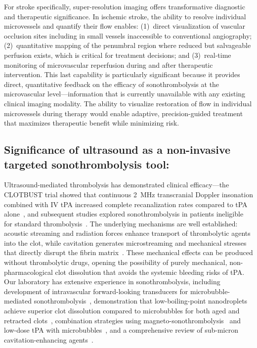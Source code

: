 For stroke specifically, super-resolution imaging offers transformative diagnostic and therapeutic significance. In ischemic stroke, the ability to resolve individual microvessels and quantify their flow enables: (1)~direct visualization of vascular occlusion sites including in small vessels inaccessible to conventional angiography; (2)~quantitative mapping of the penumbral region where reduced but salvageable perfusion exists, which is critical for treatment decisions; and (3)~real-time monitoring of microvascular reperfusion during and after therapeutic intervention. This last capability is particularly significant because it provides direct, quantitative feedback on the efficacy of sonothrombolysis at the microvascular level---information that is currently unavailable with any existing clinical imaging modality. The ability to visualize restoration of flow in individual microvessels during therapy would enable adaptive, precision-guided treatment that maximizes therapeutic benefit while minimizing risk.

\subsection{Significance of ultrasound as a non-invasive targeted sonothrombolysis tool:}
Ultrasound-mediated thrombolysis has demonstrated clinical efficacy---the CLOTBUST trial showed that continuous 2~MHz transcranial Doppler insonation combined with IV tPA increased complete recanalization rates compared to tPA alone~\cite{alexandrov2004ultrasound}, and subsequent studies explored sonothrombolysis in patients ineligible for standard thrombolysis~\cite{eggers2005sonothrombolysis,eggers2008sonothrombolysis}. The underlying mechanisms are well established: acoustic streaming and radiation forces enhance transport of thrombolytic agents into the clot, while cavitation generates microstreaming and mechanical stresses that directly disrupt the fibrin matrix~\cite{datta2006correlation,everbach2000cavitational}. These mechanical effects can be produced without thrombolytic drugs, opening the possibility of purely mechanical, non-pharmacological clot dissolution that avoids the systemic bleeding risks of tPA. Our laboratory has extensive experience in sonothrombolysis, including development of intravascular forward-looking transducers for microbubble-mediated sonothrombolysis~\cite{kim2017intravascular,kim2021multi,goel2021safety}, demonstration that low-boiling-point nanodroplets achieve superior clot dissolution compared to microbubbles for both aged and retracted clots~\cite{kim2020comparison,kim2022analysis,goel2021nanodroplet}, combination strategies using magneto-sonothrombolysis~\cite{zhang2021magneto} and low-dose tPA with microbubbles~\cite{goel2020examining}, and a comprehensive review of sub-micron cavitation-enhancing agents~\cite{bautista2023current}.

